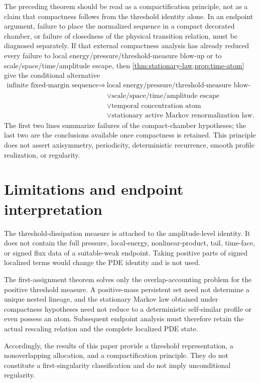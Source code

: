 \documentclass[11pt]{article}
\theoremstyle{definition}\newtheorem{definition}[theorem]{Definition}
\theoremstyle{remark}\newtheorem{remark}[theorem]{Remark}
\begin{document}
The preceding theorem should be read as a compactification principle, not as a
claim that compactness follows from the threshold identity alone.  In an
endpoint argument, failure to place the normalized sequence in a compact
decorated chamber, or failure of closedness of the physical transition
relation, must be diagnosed separately.  If that external compactness analysis
has already reduced every failure to local energy/pressure/threshold-measure
blow-up or to scale/space/time/amplitude escape, then
\cref{thm:stationary-law,prop:time-atom} give the conditional alternative
\[
\boxed{
\begin{aligned}
\text{infinite fixed-margin sequence}\Longrightarrow{}&
\text{local energy/pressure/threshold-measure blow-up}\\
&\vee\text{scale/space/time/amplitude escape}\\
&\vee\text{temporal concentration atom}\\
&\vee\text{stationary active Markov renormalization law}.
\end{aligned}}
\]
The first two lines summarize failures of the compact-chamber hypotheses; the
last two are the conclusions available once compactness is retained.  This
principle does not assert axisymmetry, periodicity, deterministic recurrence,
smooth profile realization, or regularity.


\section{Limitations and endpoint interpretation}
The threshold-dissipation measure is attached to the amplitude-level identity.  It does not contain the full pressure, local-energy, nonlinear-product, tail, time-face, or signed flux data of a suitable-weak endpoint.  Taking positive parts of signed localized terms would change the PDE identity and is not used.

The first-assignment theorem solves only the overlap-accounting problem for the positive threshold measure.  A positive-mass persistent set need not determine a unique nested lineage, and the stationary Markov law obtained under compactness hypotheses need not reduce to a deterministic self-similar profile or even possess an atom.  Subsequent endpoint analysis must therefore retain the actual rescaling relation and the complete localized PDE state.

Accordingly, the results of this paper provide a threshold representation, a nonoverlapping allocation, and a compactification principle.  They do not constitute a first-singularity classification and do not imply unconditional regularity.
\end{document}
